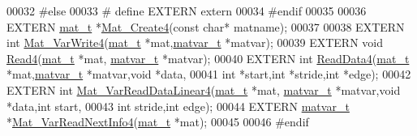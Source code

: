 \begin{DoxyCode}
00032 \textcolor{preprocessor}{#else}
00033 \textcolor{preprocessor}{#   define EXTERN extern}
00034 \textcolor{preprocessor}{#endif}
00035 
00036 EXTERN \hyperlink{struct__mat__t}{mat\_t}    *\hyperlink{mat4_8c_aa819b0bf76cab52a202742dd4102c18d}{Mat\_Create4}(\textcolor{keyword}{const} \textcolor{keywordtype}{char}* matname);
00037 
00038 EXTERN \textcolor{keywordtype}{int}       \hyperlink{mat4_8c_aa19d44f9375c3f316de3c288642b42c3}{Mat\_VarWrite4}(\hyperlink{struct__mat__t}{mat\_t} *mat,\hyperlink{group___m_a_t_structmatvar__t}{matvar\_t} *matvar);
00039 EXTERN \textcolor{keywordtype}{void}      \hyperlink{mat4_8c_a48f37c81ddb08c15bd949ccd31a8aee9}{Read4}(\hyperlink{struct__mat__t}{mat\_t} *mat, \hyperlink{group___m_a_t_structmatvar__t}{matvar\_t} *matvar);
00040 EXTERN \textcolor{keywordtype}{int}       \hyperlink{mat4_8c_a6c3186af92bf92da475cd4142c325ba5}{ReadData4}(\hyperlink{struct__mat__t}{mat\_t} *mat,\hyperlink{group___m_a_t_structmatvar__t}{matvar\_t} *matvar,\textcolor{keywordtype}{void} *data,
00041                      \textcolor{keywordtype}{int} *start,\textcolor{keywordtype}{int} *stride,\textcolor{keywordtype}{int} *edge);
00042 EXTERN \textcolor{keywordtype}{int}       \hyperlink{group___m_a_t_gab9f3d6b362bfa1fa92ed2afb8281cff4}{Mat\_VarReadDataLinear4}(\hyperlink{struct__mat__t}{mat\_t} *mat,
      \hyperlink{group___m_a_t_structmatvar__t}{matvar\_t} *matvar,\textcolor{keywordtype}{void} *data,\textcolor{keywordtype}{int} start,
00043                      \textcolor{keywordtype}{int} stride,\textcolor{keywordtype}{int} edge);
00044 EXTERN \hyperlink{group___m_a_t_structmatvar__t}{matvar\_t} *\hyperlink{mat4_8c_a494a64be8f002874f2048687561f65d3}{Mat\_VarReadNextInfo4}(\hyperlink{struct__mat__t}{mat\_t} *mat);
00045 
00046 \textcolor{preprocessor}{#endif}
\end{DoxyCode}
